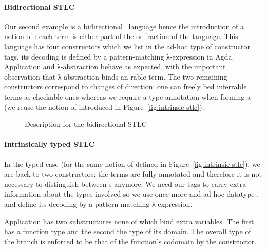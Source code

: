 \paragraph{Bidirectional STLC}\label{par:bidirectional} Our second example is a
bidirectional~\cite{pierce2000local} language hence the introduction of a
notion of : each term is either part of the  or
 fraction of the language. This language has four constructors
which we list in the ad-hoc  type of constructor tags, its
decoding  is defined by a pattern-matching λ-expression in Agda.
Application and λ-abstraction behave as expected, with the important
observation that λ-abstraction binds an rable term. The two
remaining constructors correspond to changes of direction: one can freely
bed inferrable terms as checkable ones whereas we require a type
annotation when forming a  (we reuse the notion of  introduced
in Figure~\ref{fig:intrinsic-stlc}).

\begin{figure}[h]
\begin{minipage}[t]{0.4\textwidth}
\end{minipage}\hfill
\begin{minipage}[t]{0.5\textwidth}
\end{minipage}
  \caption{Description for the bidirectional STLC\label{fig:descBidiSTLC}}
\end{figure}

\paragraph{Intrinsically typed STLC}\label{par:intrinsicSTLC}
In the typed case (for the same notion of  defined in
Figure~\ref{fig:intrinsic-stlc}), we are back to two
constructors: the terms are fully annotated and therefore it is not necessary
to distinguish between s anymore. We need our tags to carry extra
information about the types involved so we use once more and ad-hoc datatype
, and define its decoding  by a pattern-matching λ-expression.

Application has two substructures none of which bind extra variables. The first
has a function type and the second the type of its domain. The overall type of
the branch is enforced to be that of the function's codomain by the 
constructor.

